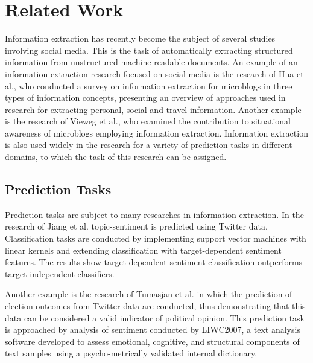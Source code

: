 
\chapter{Related Work} %

\label{ch:literature} %



Information extraction has recently become the subject of several studies involving social media. 
This is the task of automatically extracting structured information from unstructured machine-readable documents. An example of an information extraction research focused on social media is the research of Hua et al.\cite{hua_overview}, who conducted a survey on information extraction for microblogs in three types of information concepts, presenting an overview of approaches used in research for extracting personal, social and travel information. Another example is the research of Vieweg et al.\cite{vieweg}, who examined the contribution to situational awareness of microblogs employing information extraction. Information extraction is also used widely in the research for a variety of prediction tasks in different domains, to which the task of this research can be assigned.

\section{Prediction Tasks}
Prediction tasks are subject to many researches in information extraction. In the research of Jiang et al. \cite{jiang} topic-sentiment is predicted using Twitter data. Classification tasks are conducted by implementing support vector machines with linear kernels and extending classification with target-dependent sentiment features. The results show target-dependent sentiment classification outperforms target-independent classifiers. 

Another example is the research of Tumasjan et al. \cite{Tumasjan} in which the prediction of election outcomes from Twitter data are conducted, thus demonstrating that this data can be considered a valid indicator of political opinion. This prediction task is approached by analysis of sentiment conducted by LIWC2007, a text analysis software developed to assess emotional, cognitive, and structural components of text samples using a psycho-metrically validated internal dictionary. 

